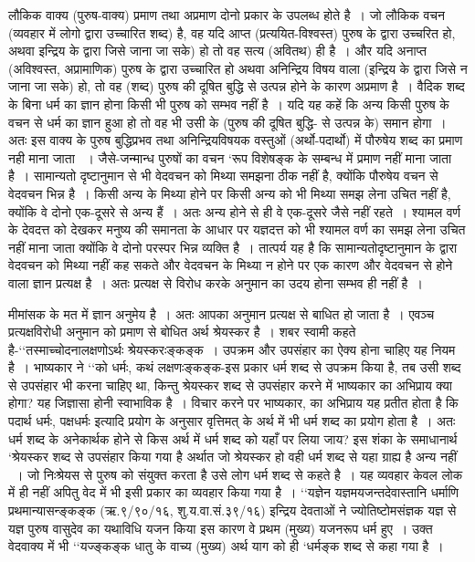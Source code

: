 {लौकिक वाक्य (पुरुष-वाक्य) प्रमाण तथा अप्रमाण दोनो प्रकार के उपलब्ध होते है~। जो लौकिक वचन (व्यवहार में लोगो द्वारा उच्चारित शब्द) है, वह यदि आप्त (प्रत्ययित-विश्वस्त) पुरुष के द्वारा उच्चरित हो, अथवा इन्द्रिय के द्वारा जिसे जाना जा सके) हो तो वह सत्य (अवितथ) ही है~। और यदि अनाप्त (अविश्वस्त, अप्रामाणिक) पुरुष के द्वारा उच्चारित हो अथवा अनिन्द्रिय विषय वाला (इन्द्रिय के द्वारा जिसे न जाना जा सके) हो, तो वह (शब्द) पुरुष की दूषित बुद्धि से उत्पन्न होने के कारण अप्रमाण है~। वैदिक शब्द के बिना धर्म का ज्ञान होना किसी भी पुरुष को सम्भव नहीं है~। यदि यह कहें कि अन्य किसी पुरुष के वचन से धर्म का ज्ञान हुआ हो तो वह भी उसी के (पुरुष की दूषित बुद्धि- से उत्पन्न के) समान होगा~। अतः इस वाक्य के पुरुष बुद्धिप्रभव तथा अनिन्द्रियविषयक वस्तुओं (अर्थो-पदार्थो) में पौरुषेय शब्द का प्रमाण नही माना जाता ~। जैसे-जन्मान्ध पुरुषों का वचन ‘रूप विशेषङ्क के सम्बन्ध में प्रमाण नहीं माना जाता है~। सामान्यतो दृष्टानुमान से भी वेदवचन को मिथ्या समझना ठीक नहीं है, क्योंकि पौरुषेय वचन से वेदवचन भिन्न है~। किसी अन्य के मिथ्या होने पर किसी अन्य को भी मिथ्या समझ लेना उचित नहीं है, क्योंकि वे दोनो एक-दूसरे से अन्य हैं~। अतः अन्य होने से ही वे एक-दूसरे जैसे नहीं रहते~। श्यामल वर्ण के देवदत्त को देखकर मनुष्य की समानता के आधार पर यज्ञदत्त को भी श्यामल वर्ण का समझ लेना उचित नहीं माना जाता क्योंकि वे दोनो परस्पर भिन्न व्यक्ति है~। तात्पर्य यह है कि सामान्यतोदृष्टानुमान के द्वारा वेदवचन को मिथ्या नहीं कह सकते और वेदवचन के मिथ्या न होने पर एक कारण और वेदवचन से होने वाला ज्ञान प्रत्यक्ष है~। अतः प्रत्यक्ष से विरोध करके अनुमान का उदय होना सम्भव ही नहीं है~। 

मीमांसक के मत में ज्ञान अनुमेय है~। अतः आपका अनुमान प्रत्यक्ष से बाधित हो जाता है~। एवञ्च प्रत्यक्षविरोधी अनुमान को प्रमाण से बोधित अर्थ श्रेयस्कर है~। शबर स्वामी कहते है-‘‘तस्माच्चोदनालक्षणोऽर्थः श्रेयस्करःङ्कङ्क~। उपक्रम और उपसंहार का ऐक्य होना चाहिए यह नियम है~। भाष्यकार ने ‘‘को धर्मः, कथं लक्षणःङ्कङ्क-इस प्रकार धर्म शब्द से उपक्रम किया है, तब उसी शब्द से उपसंहार भी करना चाहिए था, किन्तु श्रेयस्कर शब्द से उपसंहार करने में भाष्यकार का अभिप्राय क्या होगा? यह जिज्ञासा होनी स्वाभाविक है~। विचार करने पर भाष्यकार, का अभिप्राय यह प्रतीत होता है कि पदार्थ धर्मः, पक्षधर्मः इत्यादि प्रयोग के अनुसार वृत्तिमत् के अर्थ में भी धर्म शब्द का प्रयोग होता है~। अतः धर्म शब्द के अनेकार्थक होने से किस अर्थ में धर्म शब्द को यहाँ पर लिया जाय? इस शंका के समाधानार्थ ‘श्रेयस्कर शब्द से उपसंहार किया गया है अर्थात जो श्रेयस्कर हो वही धर्म शब्द से यहा ग्राह्य है अन्य नहीं ~। जो निःश्रेयस से पुरुष को संयुक्त करता है उसे लोग धर्म शब्द से कहते है~। यह व्यवहार केवल लोक में ही नहीं अपितु वेद में भी इसी प्रकार का व्यवहार किया गया है~। ‘‘यज्ञेन यज्ञमयजन्तदेवास्तानि धर्माणि प्रथमान्यासन्ङ्कङ्क (ऋ.९/९०/१६, शु.य.वा.सं.३९/१६) इन्द्रिय देवताओं ने ज्योतिष्टोमसंज्ञक यज्ञ से यज्ञ पुरुष वासुदेव का यथाविधि यजन किया इस कारण वे प्रथम (मुख्य) यजनरूप धर्म हुए~। उक्त वेदवाक्य में भी ‘‘यज्ङ्कङ्क धातु के वाच्य (मुख्य) अर्थ याग को ही ‘धर्मङ्क शब्द से कहा गया है~।

}
